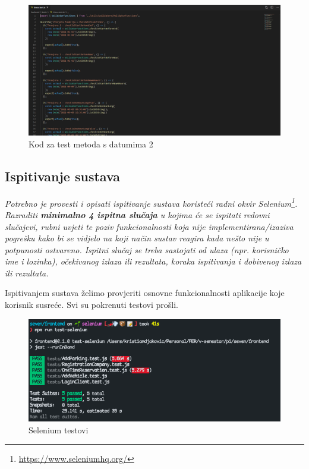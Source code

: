 			\begin{figure}[H]
				\includegraphics[width=1\linewidth]{images/Times2.png}
				\caption{Kod za test metoda s datumima 2}
				\label{fig:Times - kod2} 
			\end{figure}
			
			\subsection{Ispitivanje sustava}
			
			 \textit{Potrebno je provesti i opisati ispitivanje sustava koristeći radni okvir Selenium\footnote{\url{https://www.seleniumhq.org/}}. Razraditi \textbf{minimalno 4 ispitna slučaja} u kojima će se ispitati redovni slučajevi, rubni uvjeti te poziv funkcionalnosti koja nije implementirana/izaziva pogrešku kako bi se vidjelo na koji način sustav reagira kada nešto nije u potpunosti ostvareno. Ispitni slučaj se treba sastojati od ulaza (npr. korisničko ime i lozinka), očekivanog izlaza ili rezultata, koraka ispitivanja i dobivenog izlaza ili rezultata.\\ }
			
			Ispitivanjem sustava želimo provjeriti osnovne funkcionalnosti aplikacije koje korisnik susreće. Svi su pokrenuti testovi prošli.
			
				\begin{figure}[H]
				\includegraphics[width=1\linewidth]{images/SeleniumTests.png}
				\caption{Selenium testovi}
				\label{fig:Selenium tests} 
			\end{figure}
			
